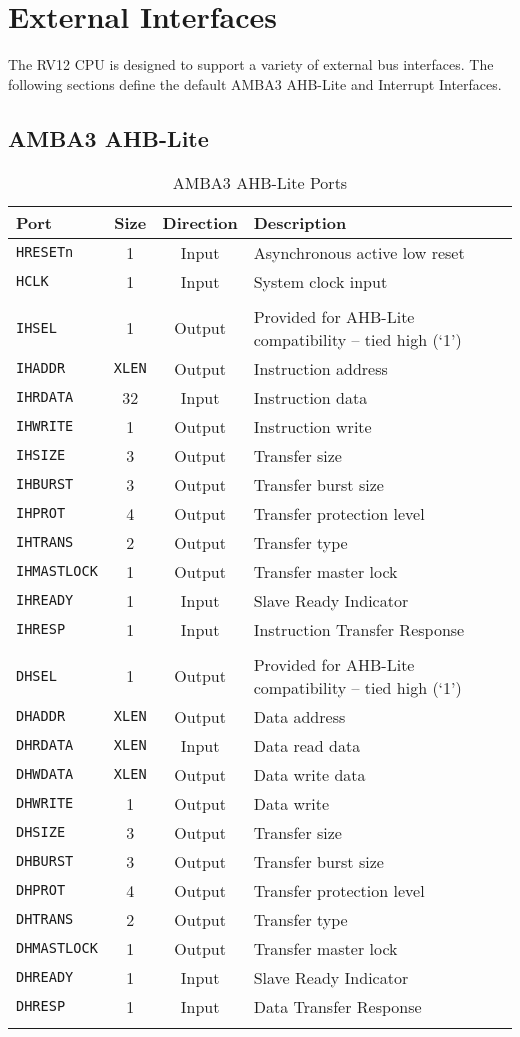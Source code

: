 \chapter{External Interfaces}\label{external-interfaces}

The RV12 CPU is designed to support a variety of external bus interfaces.
The following sections define the default AMBA3 AHB-Lite and Interrupt
Interfaces.

\section{AMBA3 AHB-Lite}\label{amba3-ahb-lite}

\begin{longtable}[]{@{}lccl@{}}
	\toprule
	Port                & Size          & Direction & Description\tabularnewline
	\midrule
	\endhead
	\texttt{HRESETn}    & 1             & Input     & Asynchronous active low reset\tabularnewline
	\texttt{HCLK}       & 1             & Input     & System clock input\tabularnewline
	                    &               &           & \tabularnewline
	\texttt{IHSEL}      & 1             & Output    & Provided for AHB-Lite compatibility -- tied high (`1')\tabularnewline
	\texttt{IHADDR}     & \texttt{XLEN} & Output    & Instruction address\tabularnewline
	\texttt{IHRDATA}    & 32            & Input     & Instruction data\tabularnewline
	\texttt{IHWRITE}    & 1             & Output    & Instruction write\tabularnewline
	\texttt{IHSIZE}     & 3             & Output    & Transfer size\tabularnewline
	\texttt{IHBURST}    & 3             & Output    & Transfer burst size\tabularnewline
	\texttt{IHPROT}     & 4             & Output    & Transfer protection level\tabularnewline
	\texttt{IHTRANS}    & 2             & Output    & Transfer type\tabularnewline
	\texttt{IHMASTLOCK} & 1             & Output    & Transfer master lock\tabularnewline
	\texttt{IHREADY}    & 1             & Input     & Slave Ready Indicator\tabularnewline
	\texttt{IHRESP}     & 1             & Input     & Instruction Transfer Response\tabularnewline
	                    &               &           & \tabularnewline
	\texttt{DHSEL}      & 1             & Output    & Provided for AHB-Lite compatibility -- tied high (`1')\tabularnewline
	\texttt{DHADDR}     & \texttt{XLEN} & Output    & Data address\tabularnewline
	\texttt{DHRDATA}    & \texttt{XLEN} & Input     & Data read data\tabularnewline
	\texttt{DHWDATA}    & \texttt{XLEN} & Output    & Data write data\tabularnewline
	\texttt{DHWRITE}    & 1             & Output    & Data write\tabularnewline
	\texttt{DHSIZE}     & 3             & Output    & Transfer size\tabularnewline
	\texttt{DHBURST}    & 3             & Output    & Transfer burst size\tabularnewline
	\texttt{DHPROT}     & 4             & Output    & Transfer protection level\tabularnewline
	\texttt{DHTRANS}    & 2             & Output    & Transfer type\tabularnewline
	\texttt{DHMASTLOCK} & 1             & Output    & Transfer master lock\tabularnewline
	\texttt{DHREADY}    & 1             & Input     & Slave Ready Indicator\tabularnewline
	\texttt{DHRESP}     & 1             & Input     & Data Transfer Response\tabularnewline
	\bottomrule
	\caption{AMBA3 AHB-Lite Ports}
	\label{tab:ahb-ports}
\end{longtable}

